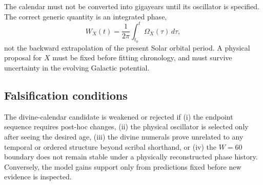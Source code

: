 The calendar must not be converted into gigayears until its oscillator is
specified.  The correct generic quantity is an integrated phase,
\[
W_X(t)=\frac{1}{2\pi}\int_{t_0}^{t}\Omega_X(\tau)\,d\tau,
\]
not the backward extrapolation of the present Solar orbital period.  A physical
proposal for $X$ must be fixed before fitting chronology, and must survive
uncertainty in the evolving Galactic potential.

\subsection{Falsification conditions}

The divine-calendar candidate is weakened or rejected if (i) the endpoint
sequence requires post-hoc changes, (ii) the physical oscillator is selected
only after seeing the desired age, (iii) the divine numerals prove unrelated
to any temporal or ordered structure beyond scribal shorthand, or (iv) the
$W=60$ boundary does not remain stable under a physically reconstructed
phase history.  Conversely, the model gains support only from predictions
fixed before new evidence is inspected.
